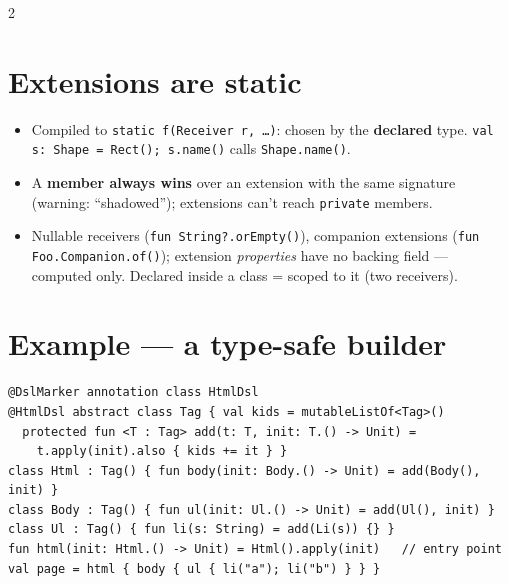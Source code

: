 \documentclass[8pt]{extarticle}
\begin{document}
\begin{multicols}{2}
\section{Extensions are static}
\begin{itemize}\raggedright
  \item Compiled to \texttt{static f(Receiver r, …)}: chosen by the \textbf{declared} type.
        \texttt{val s: Shape = Rect(); s.name()} calls \texttt{Shape.name()}.
  \item A \textbf{member always wins} over an extension with the same signature (warning:
        ``shadowed''); extensions can't reach \texttt{private} members.
  \item Nullable receivers (\texttt{fun String?.orEmpty()}), companion extensions
        (\texttt{fun Foo.Companion.of()}); extension \emph{properties} have no backing field —
        computed only. Declared inside a class = scoped to it (two receivers).
\end{itemize}

\section{Example — a type-safe builder}
\begin{lstlisting}[language=KotlinSheet]
@DslMarker annotation class HtmlDsl
@HtmlDsl abstract class Tag { val kids = mutableListOf<Tag>()
  protected fun <T : Tag> add(t: T, init: T.() -> Unit) =
    t.apply(init).also { kids += it } }
class Html : Tag() { fun body(init: Body.() -> Unit) = add(Body(), init) }
class Body : Tag() { fun ul(init: Ul.() -> Unit) = add(Ul(), init) }
class Ul : Tag() { fun li(s: String) = add(Li(s)) {} }
fun html(init: Html.() -> Unit) = Html().apply(init)   // entry point
val page = html { body { ul { li("a"); li("b") } } }
\end{lstlisting}

\columnbreak


\end{multicols}
\end{document}

